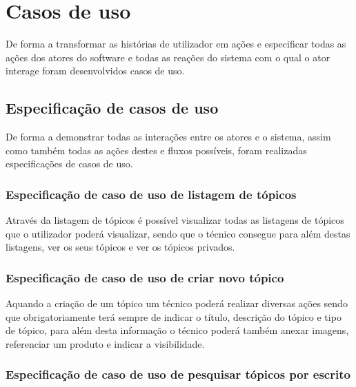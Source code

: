 \section{Casos de uso}
De forma a transformar as histórias de utilizador em ações e especificar todas as ações dos atores do 
software e todas as reações do sistema com o qual o ator interage foram desenvolvidos casos de uso.


\newpage

\subsection{Especificação de casos de uso}

De forma a demonstrar todas as interações entre os atores e o sistema, assim como também todas as ações 
destes e fluxos possíveis, foram realizadas especificações de casos de uso.

\subsubsection{Especificação de caso de uso de listagem de tópicos}

Através da listagem de tópicos é possível visualizar todas as listagens de tópicos que o utilizador poderá 
visualizar, sendo que o técnico consegue para além destas listagens, ver os seus tópicos e ver os tópicos 
privados.

%



\newpage

\subsubsection{Especificação de caso de uso de criar novo tópico}

Aquando a criação de um tópico um técnico poderá realizar diversas ações sendo que obrigatoriamente 
terá sempre de indicar o título, descrição do tópico e tipo de tópico, para além desta informação o técnico poderá também
anexar imagens, referenciar um produto e indicar a visibilidade.



\newpage

\subsubsection{Especificação de caso de uso de pesquisar tópicos por escrito}

